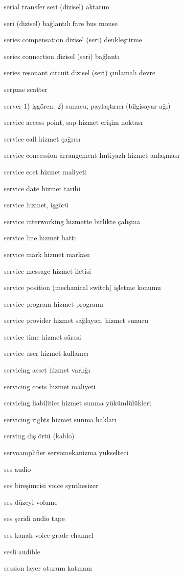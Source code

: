 \documentclass[12pt,fleqn]{article}\usepackage{../../common}
\begin{document}
serial transfer seri (dizisel) aktarım

seri (dizisel) bağlantılı fare bus mouse

series compensation dizisel (seri) denkleştirme

series connection dizisel (seri) bağlantı

series resonant circuit dizisel (seri) çınlamalı devre

serpme scatter

server 1) işgören; 2) sunucu, paylaştırıcı (bilgisayar ağı)

service access point, sap hizmet erişim noktası

service call hizmet çağrısı

service concession arrangement İmtiyazlı hizmet anlaşması

service cost hizmet maliyeti

service date hizmet tarihi

service hizmet, işgörü

service interworking hizmette birlikte çalışma

service line hizmet hattı

service mark hizmet markası

service message hizmet iletisi

service position (mechanical switch) işletme konumu

service program hizmet programı

service provider hizmet sağlayıcı, hizmet sunucu

service time hizmet süresi

service user hizmet kullanıcı

servicing asset hizmet varlığı

servicing costs hizmet maliyeti

servicing liabilities hizmet sunma yükümlülükleri

servicing rights hizmet sunma hakları

serving dış örtü (kablo)

servoamplifier servomekanizma yükselteci

ses audio

ses bireşimcisi voice synthesizer

ses düzeyi volume

ses şeridi audio tape

ses kanalı voice-grade channel

sesli audible

session layer oturum katmanı
\end{document}
